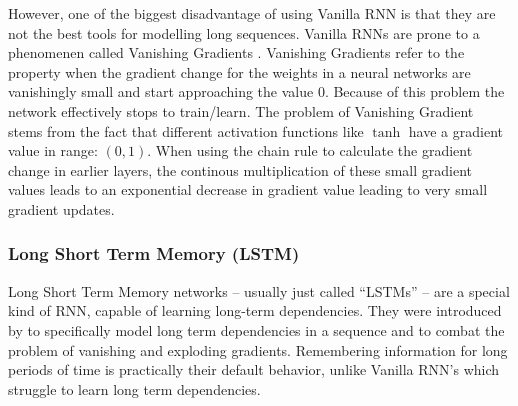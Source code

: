 \documentclass[letterpaper, 10 pt, conference]{ieeeconf}  %
\begin{document}
However, one of the biggest disadvantage of using Vanilla RNN is that they are not the best tools for modelling long sequences. Vanilla RNNs are prone to a phenomenen called Vanishing Gradients \cite{vanishing_gradient} \cite{lstm_intro}. Vanishing Gradients refer to the property when the gradient change for the weights in a neural networks are vanishingly small and start approaching the value $0$. Because of this problem the network effectively stops to train/learn. The problem of Vanishing Gradient stems from the fact that different activation functions like $\tanh$ have a gradient value in range: $(0, 1)$. When using the chain rule to calculate the gradient change in earlier layers, the continous multiplication of these small gradient values leads to an exponential decrease in gradient value leading to very small gradient updates.


\subsubsection{Long Short Term Memory (LSTM)}

Long Short Term Memory networks – usually just called “LSTMs” – are a special kind of RNN, capable of learning long-term dependencies. They were introduced by \cite{lstm_intro} to specifically model long term dependencies in a sequence and to combat the problem of vanishing and exploding gradients. Remembering information for long periods of time is practically their default behavior, unlike Vanilla RNN's which struggle to learn long term dependencies.
\end{document}
